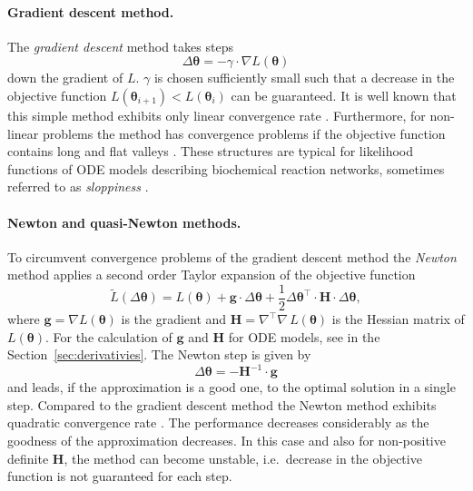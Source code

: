 \documentclass[12pt,a4paper]{scrartcl}
\begin{document}
\paragraph{Gradient descent method.}
The \emph{gradient descent} method takes steps 
\begin{equation}
	\Delta \boldsymbol{\theta} = - \gamma \cdot \nabla L(\boldsymbol{\theta}) 
\label{gradientstep}
\end{equation}	
down the gradient of $L$. $\gamma$ is chosen sufficiently small such that a decrease in 
the objective function $L(\boldsymbol{\theta}_{i+1}) < L(\boldsymbol{\theta}_{i})$ can be 
guaranteed. It is well known that this simple method exhibits only linear convergence rate 
\citep{Stoer:2005fk}. Furthermore, for non-linear problems the method has convergence 
problems if the objective function contains long and flat valleys \citep{Rosenbrock:1960fk}. 
These structures are typical for likelihood functions of ODE models describing biochemical 
reaction networks, sometimes referred to as \emph{sloppiness} \citep{Gutenkunst:2007ct}. 

\paragraph{Newton and quasi-Newton methods.}
To circumvent convergence problems of the gradient descent method the \emph{Newton} 
method applies a second order Taylor expansion of the objective function
\begin{equation}
	\tilde L(\Delta \boldsymbol{\theta}) = L(\boldsymbol{\theta}) + \mathbf{g} \cdot \Delta 
\boldsymbol{\theta} + \frac{1}{2} \Delta \boldsymbol{\theta}^\top \cdot \mathbf{H} \cdot 
\Delta \boldsymbol{\theta}, \label{2taylor}
\end{equation}
where $\mathbf{g} = \nabla L(\boldsymbol{\theta})$ is the gradient and $\mathbf{H} = 
\nabla^\top\nabla\, L(\boldsymbol{\theta})$ is the Hessian matrix of $L(\boldsymbol{\theta})
$. For the calculation of $\mathbf{g}$ and $\mathbf{H}$ for ODE models, see in the 
Section~\ref{sec:derivativies}. The Newton step is given by 
\begin{equation}
	\Delta \boldsymbol{\theta} = -\mathbf{H}^{-1} \cdot \mathbf{g} \label{newtonstep}
\end{equation}
and leads, if the approximation is a good one, to the optimal solution in a single step. 
Compared to the gradient descent method the Newton method exhibits quadratic 
convergence rate \citep{Stoer:2005fk}. The performance decreases considerably as the 
goodness of the approximation decreases. In this case and also for non-positive definite $
\mathbf{H}$, the method can become unstable, i.e.~decrease in the objective function is 
not guaranteed for each step. 
\end{document}
